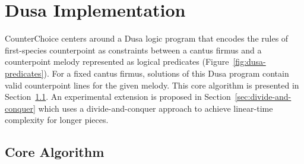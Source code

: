 



\section{Dusa Implementation}
\label{sec:dusa-implementation}

CounterChoice centers around a Dusa logic program that encodes the rules of first-species counterpoint as constraints between a cantus firmus and a counterpoint melody represented as logical predicates (Figure~\ref{fig:dusa-predicates}). For a fixed cantus firmus, solutions of this Dusa program contain valid counterpoint lines for the given melody.
This core algorithm is presented in Section~\ref{sec:core-algorithm}.
An experimental extension is proposed in Section~\ref{sec:divide-and-conquer} which uses a divide-and-conquer approach to achieve linear-time complexity for longer pieces.

\subsection{Core Algorithm}
\label{sec:core-algorithm}

